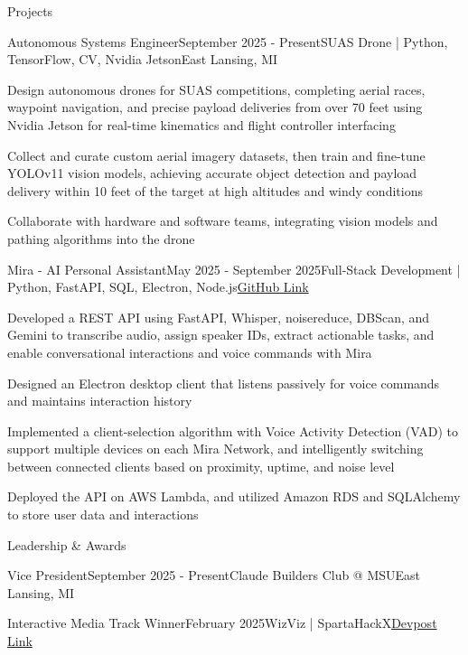 \documentclass[
	11pt
]{../resume}
\begin{document}
	\begin{rSection}{P}{rojects}
		\begin{rSectionEntry}{Autonomous Systems Engineer}{September 2025 - Present}{SUAS Drone | Python, TensorFlow, CV, Nvidia Jetson}{East Lansing, MI}
			\item Design autonomous drones for SUAS competitions, completing aerial races, waypoint navigation, and precise payload deliveries from over 70 feet using Nvidia Jetson for real-time kinematics and flight controller interfacing
			\item Collect and curate custom aerial imagery datasets, then train and fine-tune YOLOv11 vision models, achieving accurate object detection and payload delivery within 10 feet of the target at high altitudes and windy conditions
			\item Collaborate with hardware and software teams, integrating vision models and pathing algorithms into the drone
		\end{rSectionEntry}


		\begin{rSectionEntry}{Mira - AI Personal Assistant}{May 2025 - September 2025}{Full-Stack Development | Python, FastAPI, SQL, Electron, Node.js}{\href{https://github.com/mira-assistant}{GitHub Link}}
			\item Developed a REST API using FastAPI, Whisper, noisereduce, DBScan, and Gemini to transcribe audio, assign speaker IDs, extract actionable tasks, and enable conversational interactions and voice commands with Mira
			\item Designed an Electron desktop client that listens passively for voice commands and maintains interaction history
			\item Implemented a client-selection algorithm with Voice Activity Detection (VAD) to support multiple devices on each Mira Network, and intelligently switching between connected clients based on proximity, uptime, and noise level
			\item Deployed the API on AWS Lambda, and utilized Amazon RDS and SQLAlchemy to store user data and interactions
		\end{rSectionEntry}
	\end{rSection}

	\begin{rSection}{L}{eadership \& Awards}
		\begin{rSectionEntryNoBullets}{Vice President}{September 2025 - Present}{Claude Builders Club @ MSU}{East Lansing, MI}
		\end{rSectionEntryNoBullets}

		\begin{rSectionEntryNoBullets}{Interactive Media Track Winner}{February 2025}{WizViz | SpartaHackX}{\href{https://devpost.com/software/wizviz}{Devpost Link}}
		\end{rSectionEntryNoBullets}
	\end{rSection}
\end{document}
